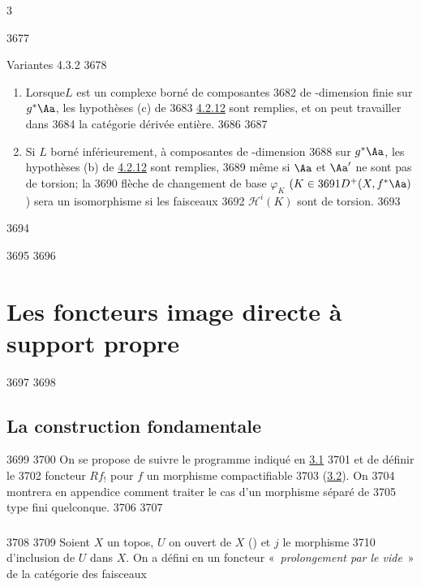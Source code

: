 3	\documentclass[10pt]{../fichiers-configuration-latex/smfart}
\begin{document}
  3677	\begin{enonce*}[remark]{Variantes 4.3.2}
  3678	\begin{enumerate}
  3679	\renewcommand{\theenumi}{\roman{enumi}}
  3680	\renewcommand{\labelenumi}{(\theenumi)}
  3681	\item Lorsque\pageoriginale $L$ est un complexe borné de composantes
  3682	de \tTor-dimension finie sur $g^{\ast}\Aa$, les hypothèses (c) de
  3683	\hyperref[XVII.subsubsec4.2.12]{4.2.12} sont remplies, et on peut travailler dans
  3684	la catégorie dérivée entière.
  3686	
  3687	\item Si $L$ borné inférieurement, à composantes de \tTor-dimension 
  3688	sur $g^{\ast}\Aa$, les hypothèses (b) de \hyperref[XVII.subsubsec4.2.12]{4.2.12} sont remplies,
  3689	même si $\Aa$ et $\Aa'$ ne sont pas de torsion; la
  3690	flèche de changement de base $\varphi_{K}$ $(K\in
  3691	D^{+}(X,f^{\ast}\Aa)$) sera un isomorphisme si les faisceaux
  3692	$ℋ^{i}(K)$ sont de torsion.
  3693	\end{enumerate}
  3694	\end{enonce*}
  3695	
  3696	\section{Les foncteurs image directe à support propre}
  3697	
  3698	\subsection{La construction fondamentale}
  3699	
  3700	On se propose de suivre le programme indiqué en \hyperref[XVII.subsec3.1]{3.1}
  3701	et de définir le
  3702	foncteur $Rf_{!}$ pour $f$ un morphisme compactifiable
  3703	(\hyperref[XVII.subsec3.2]{3.2}). On
  3704	montrera en appendice comment traiter le cas d'un morphisme séparé de
  3705	type fini quelconque.
  3706	
  3707	\subsubsection{}
  3708	
  3709	Soient $X$ un topos, $U$ on ouvert de $X$ () et $j$ le morphisme
  3710	d'inclusion de $U$ dans $X$. On a défini en  un foncteur « \emph{prolongement par le vide} »  de la catégorie des faisceaux
\end{document}

